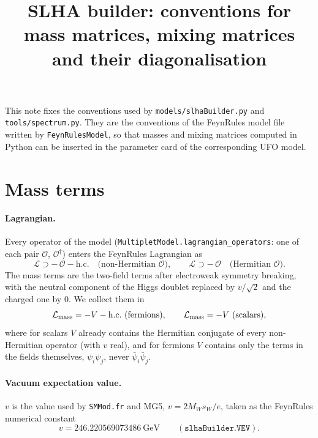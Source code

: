 \documentclass[11pt]{article}
\title{SLHA builder: conventions for mass matrices, mixing matrices\\ and their diagonalisation}
\date{}
\newcommand{\code}[1]{\texttt{#1}}
\begin{document}
\maketitle

\noindent This note fixes the conventions used by \code{models/slhaBuilder.py} and
\code{tools/spectrum.py}. They are the conventions of the FeynRules model file written by
\code{FeynRulesModel}, so that masses and mixing matrices computed in Python can be inserted
in the parameter card of the corresponding UFO model.

\section{Mass terms}

\paragraph{Lagrangian.} Every operator of the model (\code{MultipletModel.lagrangian\_operators}:
one of each pair $\mathcal O$, $\mathcal O^\dagger$) enters the FeynRules Lagrangian as
\begin{equation}
  \mathcal L \supset -\,\mathcal O - \text{h.c.}
  \quad\text{(non-Hermitian $\mathcal O$)},\qquad
  \mathcal L \supset -\,\mathcal O \quad\text{(Hermitian $\mathcal O$)} .
\end{equation}
The mass terms are the two-field terms after electroweak symmetry breaking, with the neutral
component of the Higgs doublet replaced by $v/\sqrt2$ and the charged one by $0$. We collect
them in
\begin{equation}
  \mathcal L_{\rm mass} = -V - \text{h.c.}\ (\text{fermions}), \qquad
  \mathcal L_{\rm mass} = -V \ (\text{scalars}),
\end{equation}
where for scalars $V$ already contains the Hermitian conjugate of every non-Hermitian
operator (with $v$ real), and for fermions $V$ contains only the terms in the fields
themselves, $\psi_i\psi_j$, never $\bar\psi_i\bar\psi_j$.

\paragraph{Vacuum expectation value.} $v$ is the value used by \code{SMMod.fr} and MG5,
$v = 2 M_W s_W/e$, taken as the FeynRules numerical constant
\begin{equation}
  v = 246.220569073486~\text{GeV} \qquad (\code{slhaBuilder.VEV}).
\end{equation}
\end{document}
